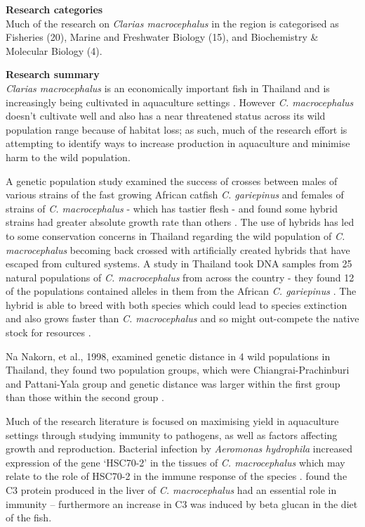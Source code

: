 \documentclass[openany]{book}
\theoremstyle{definition}
\theoremstyle{definition}
\theoremstyle{definition}
\theoremstyle{remark}
\begin{document}
\textbf{Research categories}\\
Much of the research on \emph{Clarias macrocephalus} in the region is
categorised as Fisheries (20), Marine and Freshwater Biology (15), and
Biochemistry \& Molecular Biology (4).

\textbf{Research summary}\\
\emph{Clarias macrocephalus} is an economically important fish in
Thailand and is increasingly being cultivated in aquaculture settings
\citep{Na_Nakorn_2004}. However \emph{C. macrocephalus} doesn't
cultivate well and also has a near threatened status across its wild
population range because of habitat loss; as such, much of the research
effort is attempting to identify ways to increase production in
aquaculture and minimise harm to the wild population.

A genetic population study examined the success of crosses between males
of various strains of the fast growing African catfish \emph{C.
gariepinus} and females of strains of \emph{C. macrocephalus} - which
has tastier flesh - and found some hybrid strains had greater absolute
growth rate than others \citep{Koolboon_2014}. The use of hybrids has
led to some conservation concerns in Thailand regarding the wild
population of \emph{C. macrocephalus} becoming back crossed with
artificially created hybrids that have escaped from cultured systems. A
study in Thailand took DNA samples from 25 natural populations of
\emph{C. macrocephalus} from across the country - they found 12 of the
populations contained alleles in them from the African \emph{C.
gariepinus} \citep{Na_Nakorn_2004}. The hybrid is able to breed with
both species which could lead to species extinction and also grows
faster than \emph{C. macrocephalus} and so might out-compete the native
stock for resources \citep{Na_Nakorn_2004}.

Na Nakorn, et al., 1998, examined genetic distance in 4 wild populations
in Thailand, they found two population groups, which were
Chiangrai-Prachinburi and Pattani-Yala group and genetic distance was
larger within the first group than those within the second group
\citep{Na_Nakorn_1998}.

Much of the research literature is focused on maximising yield in
aquaculture settings through studying immunity to pathogens, as well as
factors affecting growth and reproduction. Bacterial infection by
\emph{Aeromonas hydrophila} increased expression of the gene `HSC70-2'
in the tissues of \emph{C. macrocephalus} which may relate to the role
of HSC70-2 in the immune response of the species \citep{Poompoung_2012}.
\citet{Poompoung_2012} found the C3 protein produced in the liver of
\emph{C. macrocephalus} had an essential role in immunity -- furthermore
an increase in C3 was induced by beta glucan in the diet of the fish.
\end{document}
